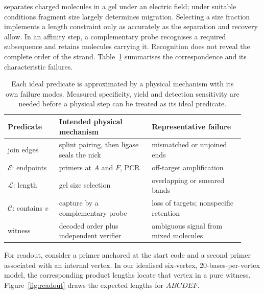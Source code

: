  separates charged molecules in a gel under an electric
field; under suitable conditions fragment size largely determines migration.\cite{NHGRIElectrophoresis}
Selecting a size fraction implements a length constraint only as accurately as
the separation and recovery allow. In an affinity step, a complementary probe
recognises a required subsequence and retains molecules carrying it. Recognition
does not reveal the complete order of the strand. Table~\ref{tab:mechanisms}
summarises the correspondence and its characteristic failures.

\begin{table}[h]
\centering\small
\caption{Each ideal predicate is approximated by a physical mechanism with its own
failure modes. Measured specificity, yield and detection sensitivity are needed
before a physical step can be treated as its ideal predicate.}\label{tab:mechanisms}
\begin{tabular}{@{}p{0.2\linewidth}p{0.36\linewidth}p{0.36\linewidth}@{}}
\toprule
Predicate & Intended physical mechanism & Representative failure\\
\midrule
join edges & splint pairing, then ligase seals the nick & mismatched or unjoined ends\\
$\mathcal E$: endpoints & primers at $A$ and $F$, PCR & off-target amplification\\
$\mathcal L$: length & gel size selection & overlapping or smeared bands\\
$\mathcal C$: contains $v$ & capture by a complementary probe & loss of targets; nonspecific retention\\
witness & decoded order plus independent verifier & ambiguous signal from mixed molecules\\
\bottomrule
\end{tabular}
\end{table}

For readout, consider a primer anchored at the start code and a second primer
associated with an internal vertex. In our idealised six-vertex, 20-bases-per-vertex
model, the corresponding product lengths locate that vertex in a pure witness.
Figure~\ref{fig:readout} draws the expected lengths for $ABCDEF$.

